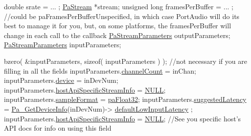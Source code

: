 \begin{DoxyCode}
\textcolor{keywordtype}{double} srate = ... ;
\hyperlink{portaudio_8h_a19874734f89958fccf86785490d53b4c}{PaStream} *stream;
\textcolor{keywordtype}{unsigned} \textcolor{keywordtype}{long} framesPerBuffer = ... ; \textcolor{comment}{//could be paFramesPerBufferUnspecified, in which case PortAudio will
       do its best to manage it for you, but, on some platforms, the framesPerBuffer will change in each call to
       the callback}
\hyperlink{struct_pa_stream_parameters}{PaStreamParameters} outputParameters;
\hyperlink{struct_pa_stream_parameters}{PaStreamParameters} inputParameters;

bzero( &inputParameters, \textcolor{keyword}{sizeof}( inputParameters ) ); \textcolor{comment}{//not necessary if you are filling in all the fields}
inputParameters.\hyperlink{struct_pa_stream_parameters_a861ff361da71fc2572dd356c9c9878ca}{channelCount} = inChan;
inputParameters.\hyperlink{struct_pa_stream_parameters_aebaf648b4d11dd1252a747b76b8da084}{device} = inDevNum;
inputParameters.\hyperlink{struct_pa_stream_parameters_aff01b9fa0710ad1654471e97665c06a9}{hostApiSpecificStreamInfo} = \hyperlink{getopt1_8c_a070d2ce7b6bb7e5c05602aa8c308d0c4}{NULL};
inputParameters.\hyperlink{struct_pa_stream_parameters_ad8d2d3063757b812f9e5f8709f41052b}{sampleFormat} = \hyperlink{portaudio_8h_a2f16d29916725b8791eae60ab9e0b081}{paFloat32};
inputParameters.\hyperlink{struct_pa_stream_parameters_aa1e80ac0551162fd091db8936ccbe9a0}{suggestedLatency} = \hyperlink{portaudio_8h_ac7d8e091ffc1d1d4a035704660e117eb}{Pa\_GetDeviceInfo}(inDevNum)->
      \hyperlink{struct_pa_device_info_aad6629064b8c7cf043d237ea0a5cc534}{defaultLowInputLatency} ;
inputParameters.\hyperlink{struct_pa_stream_parameters_aff01b9fa0710ad1654471e97665c06a9}{hostApiSpecificStreamInfo} = \hyperlink{getopt1_8c_a070d2ce7b6bb7e5c05602aa8c308d0c4}{NULL}; \textcolor{comment}{//See you specific host's
       API docs for info on using this field}



\end{DoxyCode}
